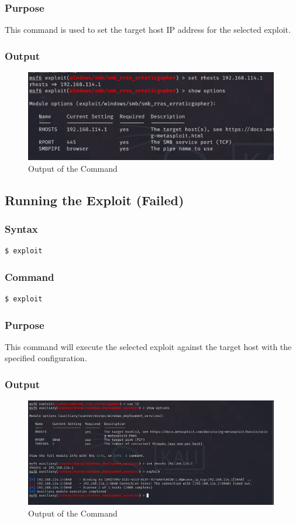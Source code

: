 \documentclass[11pt]{article}
\begin{document}
\subsubsection*{Purpose}
This command is used to set the target host IP address for the selected exploit.
\subsubsection*{Output}
\begin{figure}[H]
    \centering
    \includegraphics[width=0.99\textwidth]{a3_ss (22).png}
    \caption{Output of the Command}
\end{figure}
\subsection{Running the Exploit (Failed)}

\subsubsection*{Syntax}
\begin{verbatim}
$ exploit
\end{verbatim}

\subsubsection*{Command}
\begin{verbatim}
$ exploit
\end{verbatim}

\subsubsection*{Purpose}
This command will execute the selected exploit against the target host with the specified configuration.
\subsubsection*{Output}
\begin{figure}[H]
    \centering
    \includegraphics[width=0.99\textwidth]{a3_ss (23).png}
    \caption{Output of the Command}
\end{figure}
\end{document}
